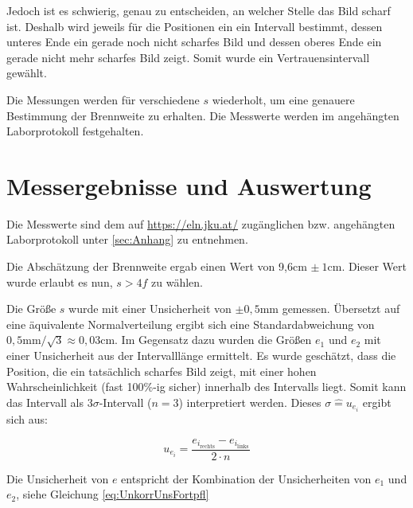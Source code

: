 \documentclass[a4paper,12pt]{article}
\begin{document}
Jedoch ist es schwierig, genau zu entscheiden, an welcher Stelle das Bild scharf ist. Deshalb wird jeweils für 
die Positionen ein ein Intervall bestimmt, dessen unteres Ende ein gerade noch nicht scharfes Bild und dessen oberes
Ende ein gerade nicht mehr scharfes Bild zeigt. Somit wurde ein Vertrauensintervall gewählt.

Die Messungen werden für verschiedene $s$ wiederholt, um eine genauere Bestimmung der Brennweite
zu erhalten. Die Messwerte werden im angehängten Laborprotokoll festgehalten.

\section{Messergebnisse und Auswertung}

Die Messwerte sind dem auf \url{https://eln.jku.at/} zugänglichen bzw. angehängten Laborprotokoll unter \ref{sec:Anhang} zu entnehmen.         %


Die Abschätzung der Brennweite ergab einen Wert von 9,6cm $\pm\:1\mathrm{cm}$. Dieser Wert wurde
erlaubt es nun, $s>4f$ zu wählen.

Die Größe $s$ wurde mit einer Unsicherheit von $\pm 0,5\mathrm{mm}$ gemessen. Übersetzt auf eine äquivalente
Normalverteilung ergibt sich eine Standardabweichung von $0,5\mathrm{mm} / \sqrt{3} \approx 0,03\mathrm{cm}$.
Im Gegensatz dazu wurden die Größen $e_1$ und $e_2$ mit einer Unsicherheit aus der Intervalllänge
ermittelt. Es wurde geschätzt, dass die Position, die ein tatsächlich scharfes Bild zeigt, mit einer
hohen Wahrscheinlichkeit (fast 100\%-ig sicher) innerhalb des Intervalls liegt. Somit kann das 
Intervall als $3\sigma$-Intervall ($n=3$) interpretiert werden. Dieses $\sigma\widehat{=}u_{e_i}$ ergibt sich aus:

\begin{equation}
    \label{eq:BesselAbstandUnsicherheit}
    u_{e_i} = \frac{e_{i_\mathrm{rechts}} - e_{i_\mathrm{links}}}{2\cdot n}
\end{equation}

Die Unsicherheit von $e$ entspricht der Kombination der Unsicherheiten von $e_1$ und $e_2$, siehe Gleichung \ref{eq:UnkorrUnsFortpfl}
\end{document}
